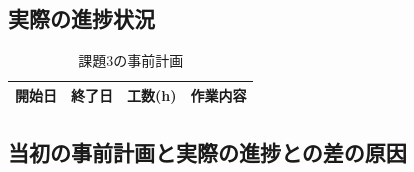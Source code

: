 \documentclass{jlreq}
\begin{document}
\subsection{実際の進捗状況}
\begin{table}[H]
  \centering
  \caption{課題3の事前計画}
  \begin{tabular}{cccp{7cm}}
    \hline
    開始日 & 終了日 & 工数(h) & 作業内容 \\ \hline
  \end{tabular}
\end{table}

\subsection{当初の事前計画と実際の進捗との差の原因}
\end{document}
